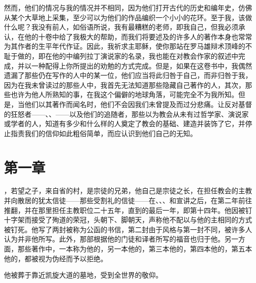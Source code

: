 然而，他们的情况与我的情况并不相同，因为他们打开古代的历史和编年史，仿佛从某个大草地上采集，至少可以为他们的作品编织一个小小的花环。至于我，该做什么呢？我没有前人，如俗语所说，我有最糟糕的老师，即我自己，但我必须承认，在他的十卷中给了我极大的帮助，而我们将要述及的许多人的著作本身也常常为其作者的生平年代作证。因此，我祈求主耶稣，使你那站在罗马雄辩术顶峰的不耻于做的，即在他的中编列拉丁演说家的名录，我也能在对教会作家的叙述中完成，并以一种配得上你所提出的劝勉的方式完成。但是，如果在这卷书中，我偶然遗漏了那些仍在写作的人中的某一位，他们应当将此归咎于自己，而非归咎于我，因为在我未曾读过的那些人中，我首先无法知道那些隐藏自己著作的人，其次，那些也许为他人所熟知的事，在我这个偏僻的地球角落，可能完全不为我所知。但是，当他们以其著作而闻名时，他们不会因我们未曾提及而过分悲痛。让反对基督的狂怒者——、、——以及他们的追随者，那些以为教会从未有过哲学家、演说家或学者的人，知道有多少和什么样的人奠定了教会的基础、建造并装饰了它，并停止指责我们的信仰如此粗俗简单，而应认识到他们自己的无知。\par


\section{第一章}

，若望之子，来自省的村，是宗徒的兄弟，他自己是宗徒之长，在担任教会的主教并向散居的犹太信徒——那些受割礼的信徒——在、、、和宣讲之后，在第二年前往推翻，并在那里担任主教职位二十五年，直到的最后一年，即第十四年。他因被钉十字架而接受了殉道的荣冠，头朝下、脚朝天，声称他不配以与他的主相同的方式被钉死。他写了两封被称为公函的书信，第二封由于风格与第一封不同，被许多人认为并非他所写。此外，那部根据他的门徒和译者所写的福音也归于他。另一方面，那些著作中，一本称为他的，另一本他的，第三本他的，第四本他的，第五本他的，都被视为伪经而予以拒绝。\par

他被葬于靠近凯旋大道的墓地，受到全世界的敬仰。\par

